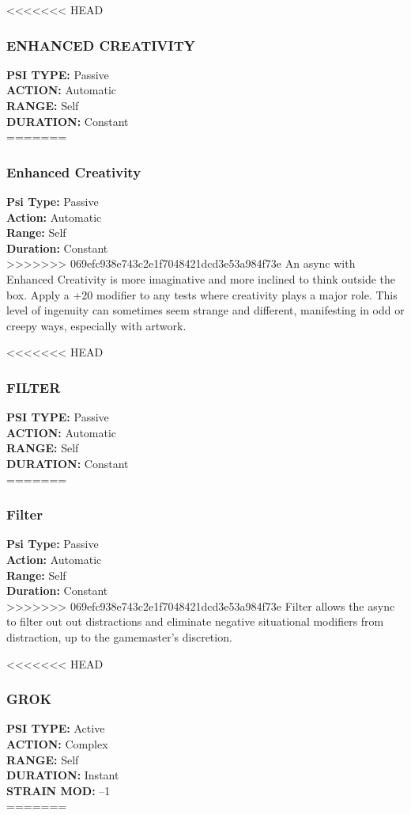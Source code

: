 <<<<<<< HEAD
\subsubsection{ENHANCED CREATIVITY}
\textbf{PSI TYPE:} Passive \\ 
\textbf{ACTION:} Automatic \\ 
\textbf{RANGE:} Self \\ 
\textbf{DURATION:} Constant \\
=======
\subsubsection{Enhanced Creativity}
\textbf{Psi Type:} Passive \\ 
\textbf{Action:} Automatic \\ 
\textbf{Range:} Self \\ 
\textbf{Duration:} Constant \\
>>>>>>> 069efc938e743c2e1f7048421dcd3e53a984f73e
An async with Enhanced Creativity is more imaginative
and more inclined to think outside the box.
Apply a +20 modifier to any tests where creativity
plays a major role. This level of ingenuity can
sometimes seem strange and different, manifesting
in odd or creepy ways, especially with artwork.

<<<<<<< HEAD
\subsubsection{FILTER}
\textbf{PSI TYPE:} Passive \\ 
\textbf{ACTION:} Automatic \\ 
\textbf{RANGE:} Self \\ 
\textbf{DURATION:} Constant \\
=======
\subsubsection{Filter}
\textbf{Psi Type:} Passive \\ 
\textbf{Action:} Automatic \\ 
\textbf{Range:} Self \\ 
\textbf{Duration:} Constant \\
>>>>>>> 069efc938e743c2e1f7048421dcd3e53a984f73e
Filter allows the async to filter out out distractions
and eliminate negative situational modifiers from
distraction, up to the gamemaster’s discretion.

<<<<<<< HEAD
\subsubsection{GROK}
\textbf{PSI TYPE:} Active \\ 
\textbf{ACTION:} Complex \\ 
\textbf{RANGE:} Self \\ 
\textbf{DURATION:} Instant \\
\textbf{STRAIN MOD:} –1 \\
=======
